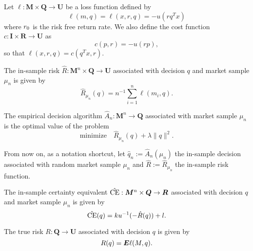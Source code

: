 \begin{deff}
  Let $\ell:\bm M\times \bm Q\to\bm U$ be a loss function defined by
  \[
    \ell(m,q) = \ell(x,r,q) = -u(rq^Tx)
  \]
  where $r_0$ is the risk free return rate. We also define the cost function
  $c:\bm I\times\bm R\to\bm U$ as
  \[
    c(p,r) = -u(rp),
  \]
  so that $\ell(x,r,q) = c(q^Tx,r)$. 
\end{deff}

\begin{deff}
  The in-sample risk $\hat R: \bm M^n\times \bm Q \to \bm U$ associated with decision $q$
  and market sample $\mu_n$ is given by
  \[
    \hat R_{\mu_n}(q) = n^{-1} \sum_{i=1}^n \ell(m_i,q).
  \]
\end{deff}

\begin{deff}
  The empirical decision algorithm $\hat A_n:\bm M^n \to \bm Q$ associated with
  market sample $\mu_n$ is the optimal value of the problem
  \[
    \text{minimize}\quad\hat R_{\mu_n}(q) + \lambda\|q\|^2.
  \]
\end{deff}

From now on, as a notation shortcut, let $\hat q_n := \hat A_n(\mu_n)$ the in-sample
decision associated with random market sample $\mu_n$ and $\hat R:=\hat R_{\mu_n}$ the
in-sample risk function.

\begin{deff}
  The in-sample certainty equivalent $\hat{\operatorname{CE}}:\bm M^n\times\bm Q\to\bm R$ associated with
  decision $q$ and market sample $\mu_n$ is given by
  \[
    \hat{\operatorname{CE}}(q) = ku^{-1}(-\hat R(q)) + l.
  \]
\end{deff}


\begin{deff}
  The true risk $R:\bm Q\to\bm U$ associated with decision $q$ is given by
  \[
    R(q) = \bm E\ell(M,q).
  \]
\end{deff}



